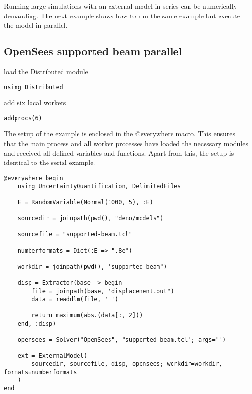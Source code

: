 Running large simulations with an external model in series can be numerically demanding. The next example shows how to run the same example but execute the model in parallel.



\subsection{OpenSees supported beam parallel}



\label{6490822231582709877}{}


load the Distributed module




\begin{verbatim}
using Distributed
\end{verbatim}



add six local workers




\begin{verbatim}
addprocs(6)
\end{verbatim}



The setup of the example is enclosed in the @everywhere macro. This ensures, that the main process and all worker processes have loaded the necessary modules and received all defined variables and functions. Apart from this, the setup is identical to the serial example.




\begin{verbatim}
@everywhere begin
    using UncertaintyQuantification, DelimitedFiles

    E = RandomVariable(Normal(1000, 5), :E)

    sourcedir = joinpath(pwd(), "demo/models")

    sourcefile = "supported-beam.tcl"

    numberformats = Dict(:E => ".8e")

    workdir = joinpath(pwd(), "supported-beam")

    disp = Extractor(base -> begin
        file = joinpath(base, "displacement.out")
        data = readdlm(file, ' ')

        return maximum(abs.(data[:, 2]))
    end, :disp)

    opensees = Solver("OpenSees", "supported-beam.tcl"; args="")

    ext = ExternalModel(
        sourcedir, sourcefile, disp, opensees; workdir=workdir, formats=numberformats
    )
end
\end{verbatim}



